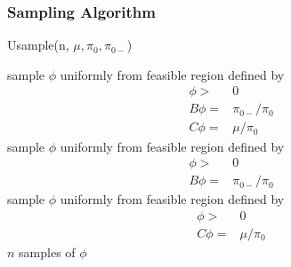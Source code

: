 \documentclass[11 pt, a4paper]{article}  %
\begin{document}

\newpage

\subsubsection{Sampling Algorithm}
\begin{algorithm}[H]
\caption{Usample(n, $\mu, \pi_0, \pi_{0-}$)}
\begin{algorithmic}[1]
\State sample $\phi$ uniformly from feasible region defined by 
\begin{align*}
\phi > & 0\\
B \phi = & \pi_{0-}/\pi_0\\ 
C \phi = & \mu/\pi_0
\end{align*}
\State sample $\phi$ uniformly from feasible region defined by 
\begin{align*}
\phi > & 0\\
B \phi = & \pi_{0-}/\pi_0
\end{align*}
\Else
\State sample $\phi$ uniformly from feasible region defined by 
\begin{align*}
\phi > & 0\\
C \phi = & \mu/\pi_0
\end{align*}
\EndIf
{} $n$ samples of $\phi$
\end{algorithmic}
\end{algorithm}
\end{document}
